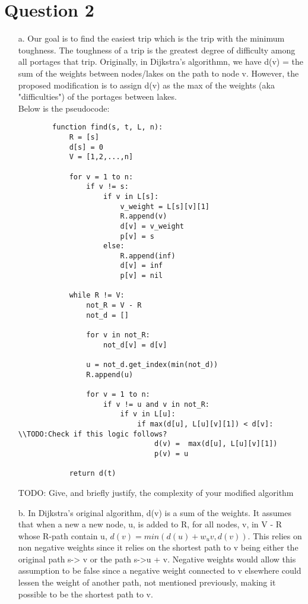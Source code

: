 \documentclass[12pt]{article}
\begin{document}
\section*{Question 2}
\begin{enumerate}
    \item[a.] Our goal is to find the easiest trip which is the trip with the minimum toughness. The toughness 
    of a trip is the greatest degree of difficulty among all portages that trip. Originally, in Dijkstra’s 
    algorithmn, we have d(v) = the sum of the weights between nodes/lakes on the path to node v. However, 
    the proposed modification is to assign d(v) as the max of the weights (aka "difficulties") of the portages 
    between lakes. \\

    Below is the pseudocode:

    \begin{verbatim}
        function find(s, t, L, n):
            R = [s]
            d[s] = 0
            V = [1,2,...,n]

            for v = 1 to n:
                if v != s:
                    if v in L[s]:
                        v_weight = L[s][v][1]
                        R.append(v)
                        d[v] = v_weight
                        p[v] = s
                    else:
                        R.append(inf)
                        d[v] = inf
                        p[v] = nil
            
            while R != V:
                not_R = V - R
                not_d = []

                for v in not_R:
                    not_d[v] = d[v]
        
                u = not_d.get_index(min(not_d))
                R.append(u)

                for v = 1 to n:
                    if v != u and v in not_R:
                        if v in L[u]:
                            if max(d[u], L[u][v][1]) < d[v]: \\TODO:Check if this logic follows?
                                d(v) =  max(d[u], L[u][v][1])
                                p(v) = u

            return d(t)
    \end{verbatim}
    TODO:   Give, and briefly justify, the complexity of your modified algorithm

    \item[b.] In Dijkstra’s original algorithm, d(v) is a sum of the weights. It assumes that when a new 
    a new node, u, is added to R, for all nodes, v, in  V - R whose R-path contain u, 
    $d(v) = min(d(u) + w_uv, d(v))$. This relies on non negative weights since it relies on the shortest path
    to v being either the original path s-> v or the path  s->u + v. Negative weights would allow this 
    assumption to be false since a negative weight connected to v elsewhere could lessen the weight of another
    path, not mentioned previously, making it possible to be the shortest path to v.\\


\end{enumerate}
\end{document}
